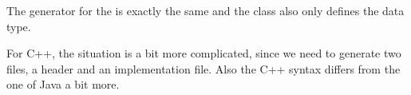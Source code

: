 The generator for the \Csharp is exactly the same and the class \href{https://github.com/fikovnik/ttc14-fixml-sigma/blob/master/ttc14-fixml-base/src/fr/inria/spirals/sigma/ttc14/fixml/ObjLang2CSharp.scala}{} also only defines the  data type.

For C++, the situation is a bit more complicated, since we need to generate two files, a header and an implementation file.
Also the C++ syntax differs from the one of Java a bit more.








